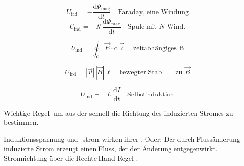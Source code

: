 \begin{formulabox}
\[ U_{\mathrm{ind}} = -\frac{\mathrm{d}\Phi_{\mathrm{mag}}}{\mathrm{d}t} \quad \text{Faraday, eine Windung} \]
\[ U_{\mathrm{ind}} = -N\,\frac{\mathrm{d}\Phi_{\mathrm{mag}}}{\mathrm{d}t} \quad \text{Spule mit $N$ Wind.} \]
\end{formulabox}

\begin{formulabox}
\[ U_{\mathrm{ind}} = \oint_C \vec{E}\cdot\mathrm{d}\vec{\ell} \quad \text{zeitabhängiges B} \]
\end{formulabox}

\begin{formulabox}
\[ U_{\mathrm{ind}} = |\vec{v}|\,|\vec{B}|\,\ell \quad \text{bewegter Stab $\perp$ zu $\vec{B}$} \]
\end{formulabox}

\begin{formulabox}
\[ U_{\mathrm{ind}} = -L\,\frac{\mathrm{d}I}{\mathrm{d}t} \quad \text{Selbstinduktion} \]
\end{formulabox}

\begin{runintext}
Wichtige Regel, um aus der  schnell die Richtung des induzierten Stromes zu bestimmen.
\end{runintext}
\begin{defbox}
Induktionsspannung und -strom wirken ihrer . Oder: Der durch Flussänderung induzierte Strom erzeugt einen Fluss, der der Änderung entgegenwirkt. Stromrichtung über die Rechte-Hand-Regel .
\end{defbox}

